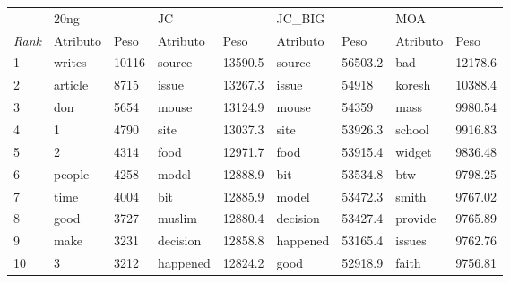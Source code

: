 \begin{tabular}{lllllllll}
	\toprule
	{}            & \multicolumn{2}{l}{20ng} & \multicolumn{2}{l}{JC} & \multicolumn{2}{l}{JC\_BIG} & \multicolumn{2}{l}{MOA}                                          \\
	\textit{Rank} & Atributo                 & Peso                   & Atributo
	              & Peso                     & Atributo               & Peso                        & Atributo                & Peso                                   \\
	\midrule
	1             & writes                   & 10116                  & source                      & 13590.5                 & source   & 56503.2 & bad     & 12178.6 \\
	2             & article                  & 8715                   & issue                       & 13267.3                 & issue    & 54918   & koresh  & 10388.4 \\
	3             & don                      & 5654                   & mouse                       & 13124.9                 & mouse    & 54359   & mass    & 9980.54 \\
	4             & 1                        & 4790                   & site                        & 13037.3                 & site     & 53926.3 & school  & 9916.83 \\
	5             & 2                        & 4314                   & food                        & 12971.7                 & food     & 53915.4 & widget  & 9836.48 \\
	6             & people                   & 4258                   & model                       & 12888.9                 & bit      & 53534.8 & btw     & 9798.25 \\
	7             & time                     & 4004                   & bit                         & 12885.9                 & model    & 53472.3 & smith   & 9767.02 \\
	8             & good                     & 3727                   & muslim                      & 12880.4                 & decision & 53427.4 & provide & 9765.89 \\
	9             & make                     & 3231                   & decision                    & 12858.8                 & happened & 53165.4 & issues  & 9762.76 \\
	10            & 3                        & 3212                   & happened                    & 12824.2                 & good     & 52918.9 & faith   & 9756.81 \\
	\bottomrule
\end{tabular}


